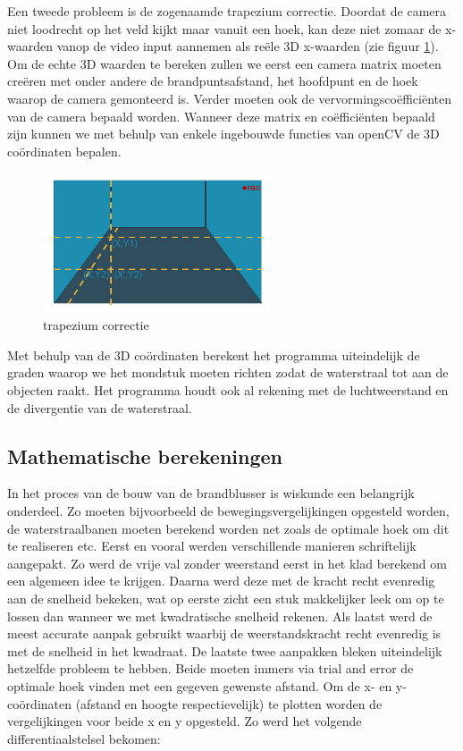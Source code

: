 \documentclass{kulakarticle}
\begin{document}
Een tweede probleem is de zogenaamde trapezium correctie. Doordat de camera niet loodrecht op het veld kijkt maar vanuit een hoek, kan deze niet zomaar de x-waarden vanop de video input aannemen als reële 3D x-waarden (zie figuur \ref{fig_trapezium}). Om de echte 3D waarden te bereken zullen we eerst een camera matrix moeten creëren met onder andere de brandpuntsafstand, het hoofdpunt en de hoek waarop de camera gemonteerd is. Verder moeten ook de vervormingscoëfficiënten van de camera bepaald worden. Wanneer deze matrix en coëfficiënten bepaald zijn kunnen we met behulp van enkele ingebouwde functies van openCV de 3D coördinaten bepalen. 

\begin{figure}[h]
	\centering
        \label{fig_trapezium}
	\includegraphics[width=0.6\textwidth]{Afbeeldingen/hoekprobleem.png}
        \caption{trapezium correctie}
 
\end{figure}

Met behulp van de 3D coördinaten berekent het programma uiteindelijk de graden waarop we het mondstuk moeten richten zodat de waterstraal tot aan de objecten raakt. Het programma houdt ook al rekening met de luchtweerstand en de divergentie van de waterstraal.


\subsection{Mathematische berekeningen}

In het proces van de bouw van de brandblusser is wiskunde een belangrijk onderdeel. Zo moeten  bijvoorbeeld de bewegingsvergelijkingen opgesteld worden, de waterstraalbanen moeten berekend worden net zoals de optimale hoek om dit te realiseren etc. 
Eerst en vooral werden verschillende manieren schriftelijk aangepakt. Zo werd de vrije val zonder weerstand eerst in het klad berekend om een algemeen idee te krijgen. Daarna werd deze met de kracht recht evenredig aan de snelheid bekeken, wat op eerste zicht een stuk makkelijker leek om op te lossen dan wanneer we met kwadratische snelheid rekenen. Als laatst werd  de meest accurate aanpak gebruikt waarbij de weerstandskracht recht evenredig is met de snelheid in het kwadraat. De laatste twee aanpakken bleken uiteindelijk hetzelfde probleem  te hebben. Beide moeten immers via trial and error de optimale hoek vinden met een gegeven gewenste afstand. 
Om de x- en y-coördinaten (afstand en hoogte respectievelijk) te plotten worden de vergelijkingen voor beide x en y opgesteld. Zo werd het volgende differentiaalstelsel bekomen: \newline
\end{document}
